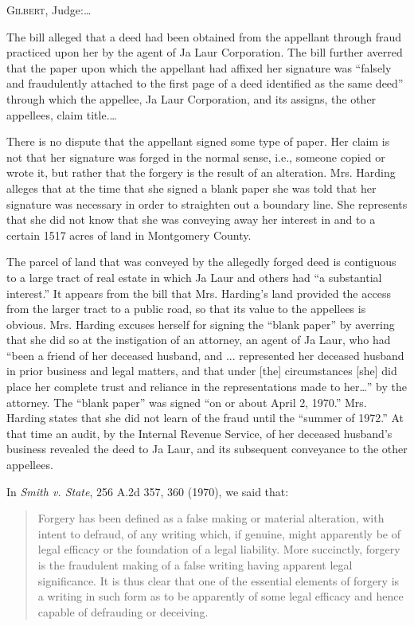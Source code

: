 
\opinion \textsc{Gilbert}, Judge:\ldots

The bill alleged that a deed had been obtained from the appellant through fraud
practiced upon her by the agent of Ja Laur Corporation. The bill further
averred that the paper upon which the appellant had affixed her signature was
``falsely and fraudulently attached to the first page of a deed identified as
the same deed'' through which the appellee, Ja Laur Corporation, and its
assigns, the other appellees, claim title.\ldots

There is no dispute that the appellant signed some type of paper. Her claim is
not that her signature was forged in the normal sense, i.e., someone copied or
wrote it, but rather that the forgery is the result of an alteration. Mrs.
Harding alleges that at the time that she signed a blank paper she was told
that her signature was necessary in order to straighten out a boundary line.
She represents that she did not know that she was conveying away her interest
in and to a certain 1517 acres of land in Montgomery County. 

The parcel of land that was conveyed by the allegedly forged deed is contiguous
to a large tract of real estate in which Ja Laur and others had ``a substantial
interest.'' It appears from the bill that Mrs. Harding's land provided the
access from the larger tract to a public road, so that its value to the
appellees is obvious. Mrs. Harding excuses herself for signing the ``blank
paper'' by averring that she did so at the instigation of an attorney, an agent
of Ja Laur, who had ``been a friend of her deceased husband, and ...
represented her deceased husband in prior business and legal matters, and that
under [the] circumstances [she] did place her complete trust and reliance in
the representations made to her\ldots'' by the attorney. The ``blank paper'' was
signed ``on or about April 2, 1970.'' Mrs. Harding states that she did not
learn of the fraud until the ``summer of 1972.'' At that time an audit, by the
Internal Revenue Service, of her deceased husband's business revealed the deed
to Ja Laur, and its subsequent conveyance to the other appellees. 

In \textit{Smith v. State}, 256 A.2d 357, 360 (1970), we said that:
\begin{quote}
Forgery has been defined as a false making or material alteration, with intent
to defraud, of any writing which, if genuine, might apparently be of legal
efficacy or the foundation of a legal liability. More succinctly, forgery is
the fraudulent making of a false writing having apparent legal significance. It
is thus clear that one of the essential elements of forgery is a writing in
such form as to be apparently of some legal efficacy and hence capable of
defrauding or deceiving. 
\end{quote}

